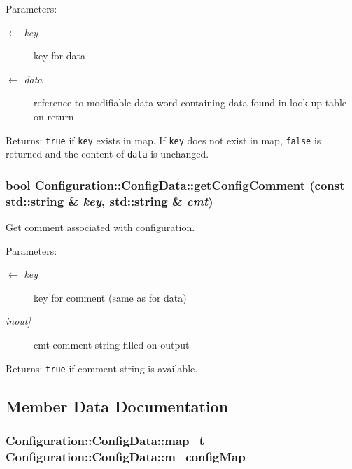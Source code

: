 \begin{Desc}
\item[Parameters:]
\begin{description}
\item[\mbox{$\leftarrow$} {\em key}]key for data \item[\mbox{$\leftarrow$} {\em data}]reference to modifiable data word containing data found in look-up table on return\end{description}
\end{Desc}
\begin{Desc}
\item[Returns:]{\tt true} if {\tt key} exists in map. If {\tt key} does not exist in map, {\tt false} is returned and the content of {\tt data} is unchanged. \end{Desc}
\hypertarget{classConfiguration_1_1ConfigData_bd01c225b3645f43d42a743128ef8a44}{
\subsubsection[getConfigComment]{\setlength{\rightskip}{0pt plus 5cm}bool Configuration::Config\-Data::get\-Config\-Comment (const std::string \& {\em key}, std::string \& {\em cmt})}}
\label{classConfiguration_1_1ConfigData_bd01c225b3645f43d42a743128ef8a44}


Get comment associated with configuration. 

\begin{Desc}
\item[Parameters:]
\begin{description}
\item[\mbox{$\leftarrow$} {\em key}]key for comment (same as for data) \item[{\em inout\mbox{]}}]cmt comment string filled on output\end{description}
\end{Desc}
\begin{Desc}
\item[Returns:]{\tt true} if comment string is available. \end{Desc}


\subsection{Member Data Documentation}
\hypertarget{classConfiguration_1_1ConfigData_2280210c3f390f612f2ff9e30bbec594}{
\subsubsection[m\_\-configMap]{\setlength{\rightskip}{0pt plus 5cm}Configuration::Config\-Data::map\_\-t Configuration::Config\-Data::m\_\-config\-Map}}
\label{classConfiguration_1_1ConfigData_2280210c3f390f612f2ff9e30bbec594}


